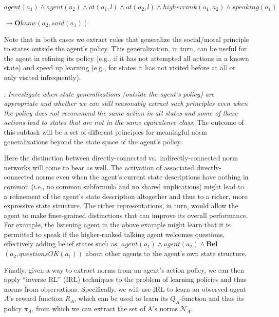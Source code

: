 \documentclass[12pt]{article}
\begin{document}
\vskip 0.1in
\noindent $agent(a_1) \land agent(a_2) \land at(a_1,l) \land at(a_2,l) \land
higherrank(a_1,a_2) \land speaking(a_1)$

$\rightarrow${\bf  O}$know(a_2,said(a_1))$
\vskip 0.1in

Note that in both cases we extract rules that generalize the
social/moral principle to states outside the agent's policy.  This
generalization, in turn, can be useful for the agent in refining its
policy (e.g., if it has not attempted all actions in a known state)
and speed up learning (e.g., for states it has not visited before at
all or only visited infrequently).

\vskip 0.05in
: {\em Investigate when state generalizations
  (outside the agent's policy) are appropriate and whether we can
  still reasonably extract such principles even when the policy does
  not recommend the same action in all states and some of these
  actions lead to states that are not in the same equivalence
  class.} 
  \vskip 0.05in  
 \noindent The outcome of this subtask will be a set of different
  principles for meaningful norm generalizations beyond the state
  space of the agent's policy.  

Here the distinction between directly-connected vs.\
indirectly-connected norm networks will come to bear as well.  The
activation of associated directly-connected norms even when the agent's
current state descriptions have nothing in common (i.e.,
no common subformula and no shared implications) might lead to a
refinement of the agent's state description altogether and thus to a
richer, more expressive state structure.  The richer representations,
in turn, would allow the agent to make finer-grained distinctions that
can improve its overall performance.  For example, the listening agent
in the above example might learn that it is permitted to speak if the
higher-ranked talking agent welcomes questions, effectively adding
belief states such as: $agent(a_1) \land agent(a_2) \land ${\bf Bel}$(a_2,questionsOK(a_1))$
about other agents to the agent's own state structure.

\vspace{2mm}
\noindent Finally, given a way to extract norms from an agent's action
policy, we can then apply ``inverse RL'' (IRL) techniques to the
problem of learning policies and thus norms from observations.
Specifically, we will use IRL to learn an observed agent $A$'s
reward function $R_A$, which can be used to learn its $Q_A$-function
and thus its policy $\pi_A$, from which we can extract the set of A's
norms $\mathcal{N}_A$.
\end{document}
